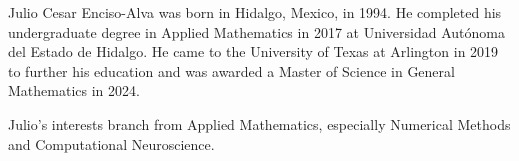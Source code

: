 
Julio Cesar Enciso-Alva was born in Hidalgo, Mexico, in 1994.
%
He completed his undergraduate degree in Applied Mathematics in 2017 at Universidad Aut\'{o}noma del Estado de Hidalgo.
%
He came to the University of Texas at Arlington in 2019 to further his education and was awarded a Master of Science in General Mathematics in 2024.

Julio's interests branch from Applied Mathematics, especially Numerical Methods and Computational Neuroscience.